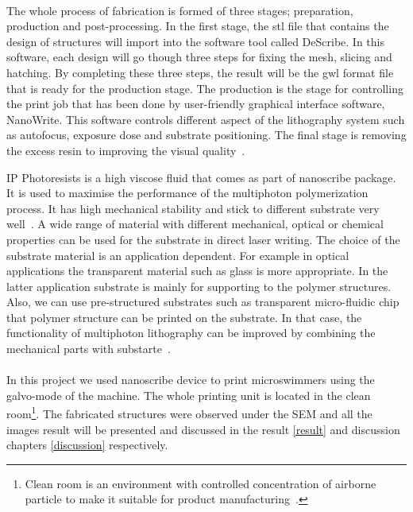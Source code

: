 \documentclass[12pt,a4paper,titlepage]{report}
\begin{document}
\paragraph{}
The whole process of fabrication is formed of three stages; preparation, production and post-processing. 
In the first stage, the \ac*{stl} file that contains the design of structures will import into the software tool
 called DeScribe. In this software, each design will go though three steps for fixing the mesh, slicing and
 hatching. By completing these three steps, the result will be the \ac*{gwl} format file that is ready for the 
production stage.   
The production is the stage for controlling the print job that has been done by user-friendly
 graphical interface software, NanoWrite. This software controls different aspect of the lithography 
system such as autofocus, exposure dose and substrate positioning.  
The final stage is removing the excess resin to improving the visual quality~\citep{Doe:2014Feb:Online}. 

IP Photoresists is a high viscose fluid that comes as part of nanoscribe package. It is
 used to maximise the performance of the multiphoton polymerization process. It has high 
mechanical stability and stick to different substrate very well~\citep{Doe:2014Feb:Online}. A wide
 range of material with different mechanical, optical or chemical properties can be used for the substrate 
in direct laser writing. The choice of the substrate material is an application dependent. For example in 
optical applications the transparent material such as glass is more appropriate. In the latter application 
substrate is mainly for supporting to the polymer structures. Also, we can use pre-structured substrates 
such as transparent micro-fluidic chip that polymer structure can be printed on the substrate. In that
 case, the functionality of multiphoton lithography can be improved by combining the mechanical parts 
with substarte~\citep{Doe:2014Feb:Online}.  

\paragraph{}
In this project we used nanoscribe device to print microswimmers using the galvo-mode of the machine. 
The whole printing unit is located in the clean room\footnote{Clean room is an environment with controlled
  concentration of airborne particle to make it suitable for product manufacturing~\citep{Doe:2014April:Online}. }. 
The fabricated structures were observed under the 
\ac*{SEM} and all the images result will be presented and discussed in the result \ref{result} and discussion
chapters \ref{discussion} respectively.
\end{document}
